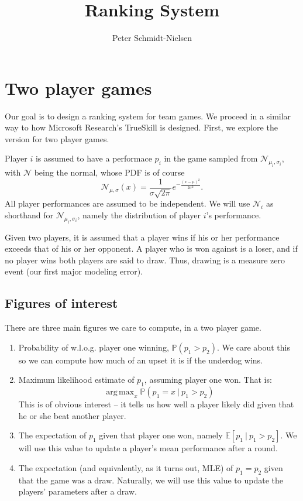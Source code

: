 \documentclass[12pt]{article}
\title{Ranking System}
\author{Peter Schmidt-Nielsen}
\DeclareMathOperator*{\argmax}{arg\,max}
\begin{document}
\maketitle

\section{Two player games}
Our goal is to design a ranking system for team games.
We proceed in a similar way to how Microsoft Research's TrueSkill is designed.
First, we explore the version for two player games.

Player $i$ is assumed to have a performace $p_i$ in the game sampled from $\mathcal{N}_{\mu_i, \sigma_i}$, with
$\mathcal{N}$ being the normal, whose PDF is of course
\[ \mathcal{N}_{\mu, \sigma}(x) = \frac1{\sigma \sqrt{2 \pi}} e^{-\frac{(x-\mu)^2}{2\sigma^2}}. \]
All player performances are assumed to be independent.
We will use $\mathcal{N}_i$ as shorthand for $\mathcal{N}_{\mu_i, \sigma_i}$, namely the distribution of player $i$'s performance.

Given two players, it is assumed that a player wins if his or her performance exceeds that of his or her opponent.
A player who is won against is a loser, and if no player wins both players are said to draw.
Thus, drawing is a measure zero event (our first major modeling error).

\subsection{Figures of interest}
There are three main figures we care to compute, in a two player game.
\begin{enumerate}
\item
	Probability of w.l.o.g. player one winning, $\mathbb{P}(p_1 > p_2)$.
	We care about this so we can compute how much of an upset it is if the underdog wins.
\item
	Maximum likelihood estimate of $p_1$, assuming player one won.
	That is:
	\[ \argmax_{x} \mathbb{P}(p_1 = x\ |\ p_1 > p_2) \]
	This is of obvious interest -- it tells us how well a player likely did given that he or she beat another player.
\item
	The expectation of $p_1$ given that player one won, namely $\mathbb{E}[p_1\ |\ p_1 > p_2]$.
	We will use this value to update a player's mean performance after a round.
\item
	The expectation (and equivalently, as it turns out, MLE) of $p_1 = p_2$ given that the game was a draw.
	Naturally, we will use this value to update the players' parameters after a draw.
\end{enumerate}
\end{document}
